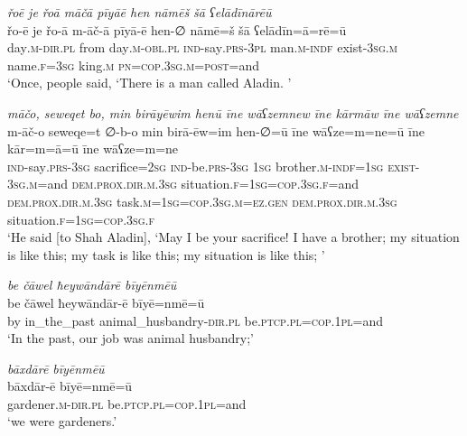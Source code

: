 \ea \label{DG.24}
\textit{řoē je řoā māčā pīyāē hen nāmēš šā ʕelādīnārēū} \\ 
\gll řo-ē je řo-ā m-āč-ā pīyā-ē hen-∅ nāmē=š šā ʕelādīn=ā=rē=ū \\ 
 day\textsc{.m}\textsc{-dir}\textsc{.pl} from day\textsc{.m}\textsc{-obl}\textsc{.pl} \textsc{ind-}say\textsc{.prs}\textsc{-3pl} man\textsc{.m}\textsc{-indf} exist\textsc{-3sg}\textsc{.m} name\textsc{\textsc{.f}}\textsc{=3sg} king\textsc{.m} \textsc{pn}\textsc{=cop}\textsc{.3sg}\textsc{.m}\textsc{=\textsc{post}}=and \\ 
\glt `Once, people said, ‘There is a man called Aladin. '
\z 
 
\ea \label{DG.34}
\textit{māčo, seweqet bo, min birāyēwim henū īne wāʕzemnew īne kārmāw īne wāʕzemne} \\ 
\gll m-āč-o seweqe=t ∅-b-o min birā-ēw=im hen-∅=ū īne wāʕze=m=ne=ū īne kār=m=ā=ū īne wāʕze=m=ne \\ 
 \textsc{ind-}say\textsc{.prs}\textsc{-3sg} sacrifice\textsc{=\textsc{2sg}} \textsc{ind-}be\textsc{.prs}\textsc{-3sg} \textsc{1sg} brother\textsc{.m}\textsc{-indf}\textsc{=1sg} \textsc{exist}\textsc{-3sg}\textsc{.m}=and \textsc{dem.prox}\textsc{.dir}\textsc{.m}\textsc{.3sg} situation\textsc{\textsc{.f}}\textsc{=1sg}\textsc{=\textsc{cop.3sg\textsc{.f}}}=and \textsc{dem.prox}\textsc{.dir}\textsc{.m}\textsc{.3sg} task\textsc{.m}\textsc{=1sg}\textsc{=cop}\textsc{.3sg}\textsc{.m}\textsc{=ez}\textsc{.gen} \textsc{dem.prox}\textsc{.dir}\textsc{.m}\textsc{.3sg} situation\textsc{\textsc{.f}}\textsc{=1sg}\textsc{=\textsc{cop.3sg\textsc{.f}}} \\ 
\glt `He said [to Shah Aladin], ‘May I be your sacrifice! I have a brother; my situation is like this; my task is like this; my situation is like this; '
\z 
 
\ea \label{DG.36}
\textit{be čāwel ħeywāndārē bīyēnmēū} \\ 
\gll be čāwel ħeywāndār-ē bīyē=nmē=ū \\ 
 by in\_the\_past animal\_husbandry\textsc{-dir}\textsc{.pl} be\textsc{.ptcp}\textsc{.pl}\textsc{=cop}\textsc{.1pl}=and \\ 
\glt `In the past, our job was animal husbandry;'
\z 
 
\ea \label{DG.37}
\textit{bāxdārē bīyēnmēū} \\ 
\gll bāxdār-ē bīyē=nmē=ū \\ 
 gardener\textsc{.m}\textsc{-dir}\textsc{.pl} be\textsc{.ptcp}\textsc{.pl}\textsc{=cop}\textsc{.1pl}=and \\ 
\glt `we were gardeners.'
\z 
 
